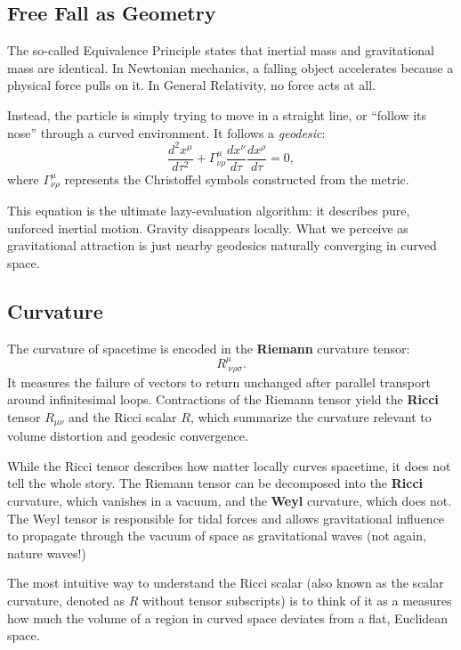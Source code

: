 \subsection*{Free Fall as Geometry}

The so-called Equivalence Principle states that inertial mass and gravitational mass are identical.
In Newtonian mechanics, a falling object accelerates because a physical force pulls on it.
In General Relativity, no force acts at all. 

Instead, the particle is simply trying to move in a straight line, or ``follow its nose'' through a curved environment.
It follows a \emph{geodesic}:
\begin{equation}
\frac{d^2 x^\mu}{d\tau^2} + \Gamma^\mu_{\nu\rho} \frac{dx^\nu}{d\tau} \frac{dx^\rho}{d\tau} = 0,
\end{equation}
where $\Gamma^\mu_{\nu\rho}$ represents the Christoffel symbols constructed from the metric. 

This equation is the ultimate lazy-evaluation algorithm: it describes pure, unforced inertial motion.
Gravity disappears locally. What we perceive as gravitational attraction is just nearby geodesics naturally converging in curved space.

\subsection*{Curvature}


The curvature of spacetime is encoded in the \textbf{Riemann} curvature tensor:
\begin{equation}
R^\mu_{\;\nu\rho\sigma}.
\end{equation}
It measures the failure of vectors to return unchanged after parallel transport around infinitesimal loops.
Contractions of the Riemann tensor yield the \textbf{Ricci} tensor $R_{\mu\nu}$ and the Ricci scalar $R$, which summarize the curvature relevant to volume distortion and geodesic convergence.

While the Ricci tensor describes how matter locally curves spacetime, it does not tell the whole story.
The Riemann tensor can be decomposed into the \textbf{Ricci} curvature, which vanishes in a vacuum, and the \textbf{Weyl} curvature, which does not.
The Weyl tensor is responsible for tidal forces and allows gravitational influence to propagate through the vacuum of space as gravitational waves (not again, nature waves!)

The most intuitive way to understand the Ricci scalar (also known as the scalar curvature, denoted as $R$ without tensor subscripts) is to think of it as a measures how much the volume of a region in curved space deviates from a flat, Euclidean space.


